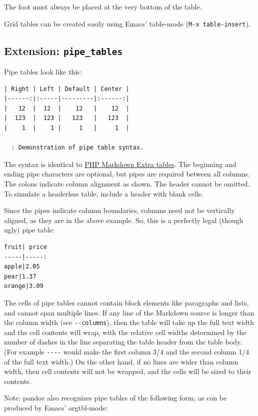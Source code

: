 \documentclass[
  b5paper
]{book}
\begin{document}
The foot must always be placed at the very bottom of the table.

Grid tables can be created easily using Emacs' table-mode
(\texttt{M-x\ table-insert}).

\subsection{\texorpdfstring{Extension:
\texttt{pipe\_tables}}{Extension: pipe\_tables}}\label{extension-pipe_tables}

Pipe tables look like this:

\begin{verbatim}
| Right | Left | Default | Center |
|------:|:-----|---------|:------:|
|   12  |  12  |    12   |    12  |
|  123  |  123 |   123   |   123  |
|    1  |    1 |     1   |     1  |

  : Demonstration of pipe table syntax.
\end{verbatim}

The syntax is identical to
\href{https://michelf.ca/projects/php-markdown/extra/\#table}{PHP
Markdown Extra tables}. The beginning and ending pipe characters are
optional, but pipes are required between all columns. The colons
indicate column alignment as shown. The header cannot be omitted. To
simulate a headerless table, include a header with blank cells.

Since the pipes indicate column boundaries, columns need not be
vertically aligned, as they are in the above example. So, this is a
perfectly legal (though ugly) pipe table:

\begin{verbatim}
fruit| price
-----|-----:
apple|2.05
pear|1.37
orange|3.09
\end{verbatim}

The cells of pipe tables cannot contain block elements like paragraphs
and lists, and cannot span multiple lines. If any line of the Markdown
source is longer than the column width (see \texttt{-\/-columns}), then
the table will take up the full text width and the cell contents will
wrap, with the relative cell widths determined by the number of dashes
in the line separating the table header from the table body. (For
example \texttt{-\/-\/-\textbar{}-} would make the first column 3/4 and
the second column 1/4 of the full text width.) On the other hand, if no
lines are wider than column width, then cell contents will not be
wrapped, and the cells will be sized to their contents.

Note: pandoc also recognizes pipe tables of the following form, as can
be produced by Emacs' orgtbl-mode:
\end{document}
